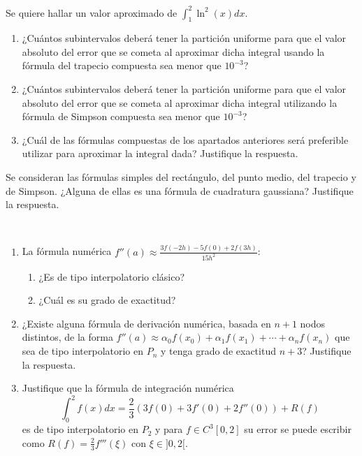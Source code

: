 \begin{ejercicio}\label{ej:2.1.20}
    Se quiere hallar un valor aproximado de $\int_{1}^{2} \ln^2(x) dx$.
    \begin{enumerate}
        \item ¿Cuántos subintervalos deberá tener la partición uniforme para que el valor absoluto del error que se cometa al aproximar dicha integral usando la fórmula del trapecio compuesta sea menor que $10^{-3}$?
        \item ¿Cuántos subintervalos deberá tener la partición uniforme para que el valor absoluto del error que se cometa al aproximar dicha integral utilizando la fórmula de Simpson compuesta sea menor que $10^{-3}$?
        \item ¿Cuál de las fórmulas compuestas de los apartados anteriores será preferible utilizar para aproximar la integral dada? Justifique la respuesta.
    \end{enumerate}
\end{ejercicio}

\begin{ejercicio}\label{ej:2.1.21}
    Se consideran las fórmulas simples del rectángulo, del punto medio, del trapecio y de Simpson. ¿Alguna de ellas es una fórmula de cuadratura gaussiana? Justifique la respuesta.
\end{ejercicio}

\begin{ejercicio}\label{ej:2.1.22}~
    \begin{enumerate}
        \item La fórmula numérica $f''(a) \approx \frac{3f(-2h) - 5f(0) + 2f(3h)}{15h^2}$:
        \begin{enumerate}
            \item ¿Es de tipo interpolatorio clásico?
            \item ¿Cuál es su grado de exactitud?
        \end{enumerate}
        \item ¿Existe alguna fórmula de derivación numérica, basada en $n + 1$ nodos distintos, de la forma $f''(a) \approx \alpha_0 f(x_0) + \alpha_1 f(x_1) + \cdots + \alpha_n f(x_n)$ que sea de tipo interpolatorio en $P_n$ y tenga grado de exactitud $n + 3$? Justifique la respuesta.
        \item Justifique que la fórmula de integración numérica $$\int_{0}^{2} f(x) dx = \frac{2}{3} (3f(0) + 3f'(0) + 2f''(0)) + R(f)$$ es de tipo interpolatorio en $P_2$ y para $f \in C^3[0, 2]$ su error se puede escribir como $R(f) = \frac{2}{3} f'''(\xi)$ con $\xi \in ]0, 2[$.
    \end{enumerate}
\end{ejercicio}

